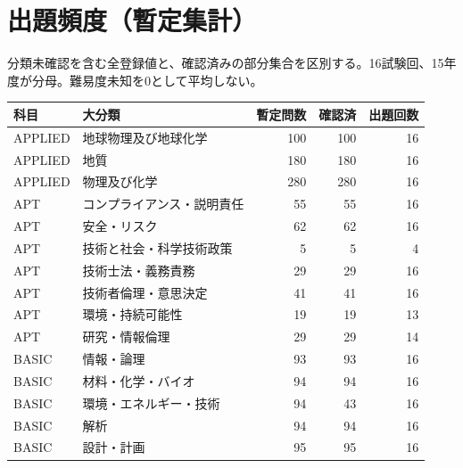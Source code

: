 \chapter{出題頻度（暫定集計）}
分類未確認を含む全登録値と、確認済みの部分集合を区別する。16試験回、15年度が分母。難易度未知を0として平均しない。
\begin{longtable}{p{.16\linewidth}p{.42\linewidth}rrr}
科目 & 大分類 & 暫定問数 & 確認済 & 出題回数\\\hline
APPLIED & 地球物理及び地球化学 & 100 & 100 & 16\\
APPLIED & 地質 & 180 & 180 & 16\\
APPLIED & 物理及び化学 & 280 & 280 & 16\\
APT & コンプライアンス・説明責任 & 55 & 55 & 16\\
APT & 安全・リスク & 62 & 62 & 16\\
APT & 技術と社会・科学技術政策 & 5 & 5 & 4\\
APT & 技術士法・義務責務 & 29 & 29 & 16\\
APT & 技術者倫理・意思決定 & 41 & 41 & 16\\
APT & 環境・持続可能性 & 19 & 19 & 13\\
APT & 研究・情報倫理 & 29 & 29 & 14\\
BASIC & 情報・論理 & 93 & 93 & 16\\
BASIC & 材料・化学・バイオ & 94 & 94 & 16\\
BASIC & 環境・エネルギー・技術 & 94 & 43 & 16\\
BASIC & 解析 & 94 & 94 & 16\\
BASIC & 設計・計画 & 95 & 95 & 16\\
\end{longtable}

